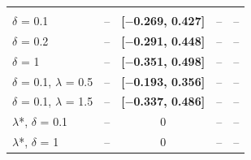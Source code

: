 \begin{table}[!htbp]
\begin{tabularx}{\linewidth}{lCCCC}
\addlinespace[3pt] \\
$\delta $ = 0.1 & -- & \textbf{[$-$0.269, 0.427]} & -- & -- \\
$\delta $ = 0.2 & -- & \textbf{[$-$0.291, 0.448]} & -- & -- \\
$\delta $ = 1 & -- & \textbf{[$-$0.351, 0.498]} & -- & -- \\
$\delta $ = 0.1, $\lambda $ = 0.5 & -- & \textbf{[$-$0.193, 0.356]} & -- & -- \\
$\delta $ = 0.1, $\lambda $ = 1.5 & -- & \textbf{[$-$0.337, 0.486]} & -- & -- \\
$\lambda $*, $\delta $ = 0.1 & -- & 0 & -- & -- \\
$\lambda $*, $\delta $ = 1 & -- & 0 & -- & -- \\
\bottomrule
\end{tabularx}
\par{}
\end{table}
